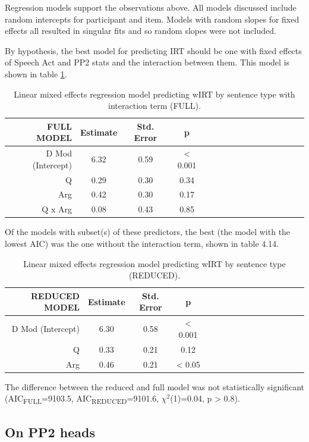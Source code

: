 \documentclass[12pt,oneside]{book}
\begin{document}
Regression models support the observations above. All models discussed include random intercepts for participant and item. Models with random slopes for fixed effects all resulted in singular fits and so random slopes were not included.

By hypothesis, the best model for predicting IRT should be one with fixed effects of Speech Act and PP2 stats and the interaction between them. This model is shown in table \ref{tab:hyp}.

\begin{table}[!h]

\caption{\label{tab:hyp}Linear mixed effects regression model predicting wIRT by sentence type with interaction term (FULL).}
\centering
\begin{tabular}{rcccrcccrcccrccc}
\toprule
FULL MODEL & Estimate & Std. Error & p\\
\midrule
D Mod (Intercept) & 6.32 & 0.59 & < 0.001\\
Q & 0.29 & 0.30 & 0.34\\
Arg & 0.42 & 0.30 & 0.17\\
Q x Arg & 0.08 & 0.43 & 0.85\\
\bottomrule
\end{tabular}
\end{table}

Of the models with subset(s) of these predictors, the best (the model with the lowest AIC) was the one without the interaction term, shown in table 4.14.

\begin{table}[!h]

\caption{\label{tab:redirt}Linear mixed effects regression model predicting wIRT by sentence type (REDUCED).}
\centering
\begin{tabular}{rcccrcccrcccrccc}
\toprule
REDUCED MODEL & Estimate & Std. Error & p\\
\midrule
D Mod (Intercept) & 6.30 & 0.58 & < 0.001\\
Q & 0.33 & 0.21 & 0.12\\
Arg & 0.46 & 0.21 & < 0.05\\
\bottomrule
\end{tabular}
\end{table}

The difference between the reduced and full model was not statistically significant (AIC\textsubscript{FULL}=9103.5, AIC\textsubscript{REDUCED}=9101.6, \(\chi^2\)(1)=0.04, p \textgreater{} 0.8).

\hypertarget{pp2h}{%
\subsection{On PP2 heads}\label{pp2h}}
\end{document}
